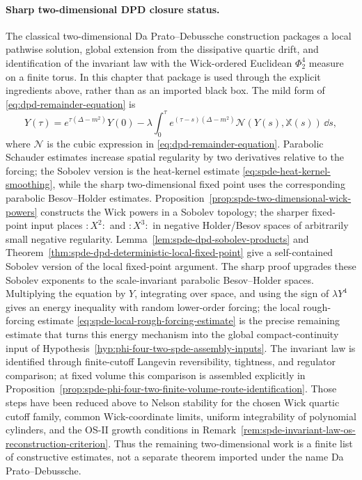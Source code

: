 \paragraph{Sharp two-dimensional DPD closure status.}
The classical two-dimensional Da Prato--Debussche construction packages a
local pathwise solution, global extension from the dissipative quartic drift,
and identification of the invariant law with the Wick-ordered Euclidean
\(\Phi^4_2\) measure on a finite torus.  In this chapter that package is
used through the explicit ingredients above, rather than as an imported
black box.  The mild form of \eqref{eq:dpd-remainder-equation} is
\[
  Y(\tau)
  =
  e^{\tau(\Delta-m^2)}Y(0)
  -
  \lambda\int_0^\tau
  e^{(\tau-s)(\Delta-m^2)}
  \mathcal N(Y(s),\mathbb X(s))\,\dd s ,
\]
where \(\mathcal N\) is the cubic expression in
\eqref{eq:dpd-remainder-equation}.  Parabolic Schauder estimates increase
spatial regularity by two derivatives relative to the forcing; the Sobolev
version is the heat-kernel estimate
\eqref{eq:spde-heat-kernel-smoothing}, while the
sharp two-dimensional fixed point uses the corresponding parabolic
Besov--Holder estimates.
Proposition~\ref{prop:spde-two-dimensional-wick-powers} constructs the Wick
powers in a Sobolev topology; the sharper fixed-point input places
\(:\!X^2\!:\) and \(:\!X^3\!:\) in negative Holder/Besov spaces of
arbitrarily small negative regularity.
Lemma~\ref{lem:spde-dpd-sobolev-products} and
Theorem~\ref{thm:spde-dpd-deterministic-local-fixed-point} give a
self-contained Sobolev version of the local fixed-point argument.  The sharp
proof upgrades these Sobolev exponents to the scale-invariant parabolic
Besov--Holder spaces.  Multiplying the equation by \(Y\), integrating over
space, and using the sign of
\(\lambda Y^4\) gives an energy inequality with random lower-order forcing;
the local rough-forcing estimate
\eqref{eq:spde-local-rough-forcing-estimate} is the precise remaining
estimate that turns this energy mechanism into the global
compact-continuity input of
Hypothesis~\ref{hyp:phi-four-two-spde-assembly-inputs}.  The invariant law
is identified through finite-cutoff Langevin reversibility, tightness, and
regulator comparison; at fixed volume this comparison is assembled explicitly
in
Proposition~\ref{prop:spde-phi-four-two-finite-volume-route-identification}.
Those steps have been reduced above to Nelson
stability for the chosen Wick quartic cutoff family, common Wick-coordinate
limits, uniform integrability of polynomial cylinders, and the OS-II growth
conditions in
Remark~\ref{rem:spde-invariant-law-os-reconstruction-criterion}.  Thus the
remaining two-dimensional work is a finite list of constructive estimates,
not a separate theorem imported under the name Da Prato--Debussche.

